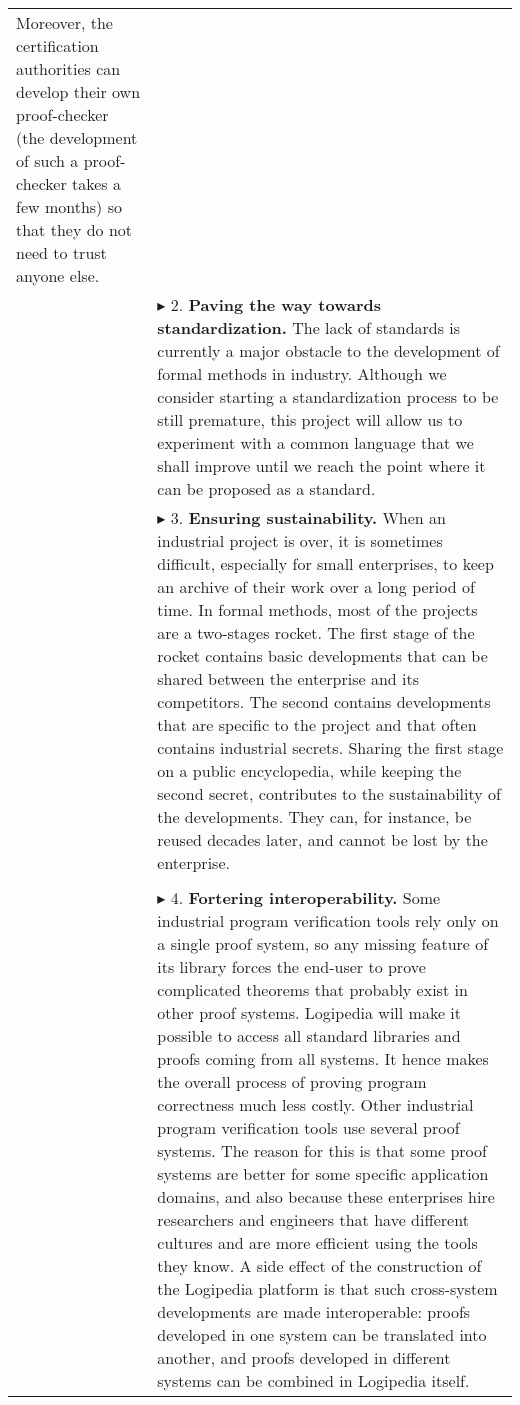\begin{longtable}{|p{}|p{}|}
Moreover, the certification authorities can develop their own
proof-checker (the development of such a proof-checker takes a few
months) so that they do not need to trust anyone else.\\
&
$\blacktriangleright$
2.
{\bf Paving the way towards standardization.}
The lack of standards is currently a major obstacle to the development
of formal methods in industry. Although we consider starting a
standardization process to be still premature, this project will allow us
to experiment with a common language that we shall improve until we
reach the point where it can be proposed as a standard.\\
&
$\blacktriangleright$
3. 
{\bf Ensuring sustainability.}
When an industrial project is over, it is sometimes difficult,
especially for small enterprises, to keep an archive of their work over
a long period of time. In formal methods, most of the projects are a
two-stages rocket. The first stage of the rocket contains basic
developments that can be shared between the enterprise and its
competitors. The second contains developments that are specific to the
project and that often contains industrial secrets.
Sharing the first stage on a public encyclopedia, while keeping the
second secret, contributes to the sustainability of the
developments. They can, for instance, be reused decades later, and
cannot be lost by the enterprise.\\
&\\
&
$\blacktriangleright$
4.
{\bf Fortering interoperability.}
  Some industrial program verification tools rely only on a single
  proof system, so any missing feature of its library forces the
  end-user to prove complicated theorems that probably exist in other
  proof systems. Logipedia will make it possible to access all
  standard libraries and proofs coming from all systems. It hence
  makes the overall process of proving program correctness much less costly.
  Other industrial program verification tools use several proof
  systems. The reason for this is that some proof systems are better for some
  specific application domains, and also
  because these enterprises hire researchers and engineers that have
  different cultures and are more efficient using the tools they know.
  A side effect of the construction of the Logipedia platform is that
  such cross-system developments are made interoperable: proofs
  developed in one system can be translated into another, and
  proofs developed in different systems can be combined in
  Logipedia itself.\\

\end{longtable}
